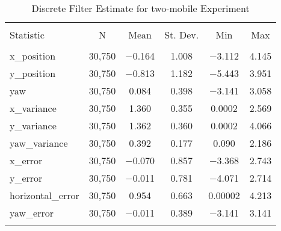 
\begin{table}[h] \centering 
  \caption{Discrete Filter Estimate for two-mobile Experiment} 
  \label{tab:two_mobile_discrete_summary} 
\begin{tabular}{@{\extracolsep{5pt}}lccccc} 
\\[-1.8ex]\hline 
\hline \\[-1.8ex] 
Statistic & \multicolumn{1}{c}{N} & \multicolumn{1}{c}{Mean} & \multicolumn{1}{c}{St. Dev.} & \multicolumn{1}{c}{Min} & \multicolumn{1}{c}{Max} \\ 
\hline \\[-1.8ex] 
x\_position & 30,750 & $-$0.164 & 1.008 & $-$3.112 & 4.145 \\ 
y\_position & 30,750 & $-$0.813 & 1.182 & $-$5.443 & 3.951 \\ 
yaw & 30,750 & 0.084 & 0.398 & $-$3.141 & 3.058 \\ 
x\_variance & 30,750 & 1.360 & 0.355 & 0.0002 & 2.569 \\ 
y\_variance & 30,750 & 1.362 & 0.360 & 0.0002 & 4.066 \\ 
yaw\_variance & 30,750 & 0.392 & 0.177 & 0.090 & 2.186 \\ 
x\_error & 30,750 & $-$0.070 & 0.857 & $-$3.368 & 2.743 \\ 
y\_error & 30,750 & $-$0.011 & 0.781 & $-$4.071 & 2.714 \\ 
horizontal\_error & 30,750 & 0.954 & 0.663 & 0.00002 & 4.213 \\ 
yaw\_error & 30,750 & $-$0.011 & 0.389 & $-$3.141 & 3.141 \\ 
\hline \\[-1.8ex] 
\end{tabular} 
\end{table} 
